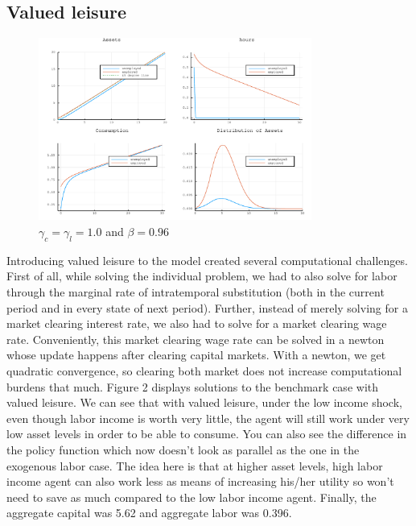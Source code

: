 \documentclass{article} %
\begin{document}
  \subsection*{Valued leisure}
\begin{figure}[h!]
  \centering
  \includegraphics[width = 0.8\textwidth]{../ElasticLabor/Solution2.pdf}
    \caption{$\gamma_c = \gamma_l = 1.0$ and $\beta = 0.96$}
  \end{figure}
  Introducing valued leisure to the model created several computational challenges. First of all, while solving the individual problem, we had to also solve for labor through the marginal rate of intratemporal substitution (both in the current period and in every state of next period). Further, instead of merely solving for a market clearing interest rate, we also had to solve for a market clearing wage rate. Conveniently, this market clearing wage rate can be solved in a newton whose update happens after clearing capital markets. With a newton, we get quadratic convergence, so clearing both market does not increase computational burdens that much.
  Figure 2 displays solutions to the benchmark case with valued leisure. We can see that with valued leisure, under the low income shock, even though labor income is worth very little, the agent will still work under very low asset levels in order to be able to consume. You can also see the difference in the policy function which now doesn't look as parallel as the one in the exogenous labor case. The idea here is that at higher asset levels, high labor income agent can also work less as means of increasing his/her utility so won't need to save as much compared to the low labor income agent. Finally, the aggregate capital was 5.62 and aggregate labor was 0.396. \\
  \\
\end{document}
